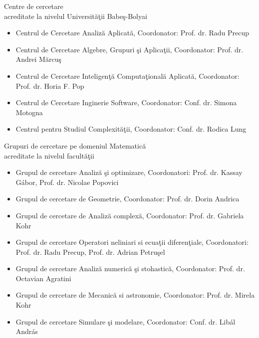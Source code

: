 \documentclass[aspectratio=169]{beamer}
\newcommand\Facultate{Facultatea de Matematic\u{a} \c{s}i Informatic\u{a}}
\begin{document}
\renewcommand*\sectionTitle{Centre de Cercetare}
\renewcommand*\sectionSubtitle{\Facultate}


\begin{frame}{Centre de cercetare\\ acreditate la nivelul Universităţii Babeş-Bolyai}
\begin{itemize}
    \item Centrul de Cercetare Analiză Aplicată, Coordonator: Prof. dr. Radu Precup
    \item Centrul de Cercetare Algebre, Grupuri şi Aplicaţii, Coordonator: Prof. dr. Andrei Mărcuş
    \item Centrul de Cercetare Inteligenţă Computaţională Aplicată, Coordonator: Prof. dr. Horia F. Pop
    \item Centrul de Cercetare Inginerie Software, Coordonator: Conf. dr. Simona Motogna
    \item Centrul pentru Studiul Complexităţii, Coordonator: Conf. dr. Rodica Lung


\end{itemize}
\end{frame}


\begin{frame}{Grupuri de cercetare pe domeniul Matematică\\ acreditate la nivelul facultăţii}
\begin{itemize}
    \item Grupul de cercetare Analiză şi optimizare, Coordonatori: Prof. dr. Kassay Gábor, Prof. dr. Nicolae Popovici
    \item Grupul de cercetare de Geometrie, Coordonator: Prof. dr. Dorin Andrica
    \item Grupul de cercetare de Analiză complexă, Coordonator: Prof. dr. Gabriela Kohr
    \item Grupul de cercetare Operatori neliniari si ecuaţii diferenţiale, Coordonatori: Prof. dr. Radu Precup, Prof. dr. Adrian Petruşel
    \item Grupul de cercetare Analiză numerică şi stohastică, Coordonator: Prof. dr. Octavian Agratini
    \item Grupul de cercetare de Mecanică si astronomie, Coordonator: Prof. dr. Mirela Kohr
    \item Grupul de cercetare Simulare şi modelare, Coordonator: Conf. dr. Libál András

\end{itemize}
\end{frame}
\end{document}
